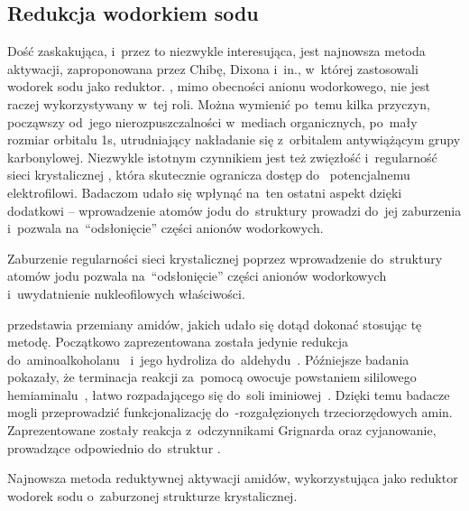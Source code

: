 \subsection{Redukcja wodorkiem sodu}\label{literature:new:sodium-hydride}
Dość zaskakująca, i~przez to niezwykle interesująca, jest najnowsza metoda aktywacji,
  zaproponowana przez Chibę, Dixona i~in., w~której zastosowali wodorek sodu jako reduktor.
, mimo obecności anionu wodorkowego, nie jest raczej wykorzystywany w~tej roli.
Można wymienić po~temu kilka przyczyn, począwszy od~jego nierozpuszczalności w~mediach
  organicznych, po~mały rozmiar orbitalu 1s, utrudniający nakładanie się z~orbitalem
  antywiążącym grupy karbonylowej.
Niezwykle istotnym czynnikiem jest też zwięzłość i~regularność sieci krystalicznej ,
  która skutecznie ogranicza dostęp do~ potencjalnemu elektrofilowi.
Badaczom udało się wpłynąć na~ten ostatni aspekt dzięki dodatkowi  \--- wprowadzenie
  atomów jodu do~struktury prowadzi do~jej zaburzenia i~pozwala na~\enquote{odsłonięcie}
  części anionów wodorkowych.
\begin{marginfigure}[-13\baselineskip]
  
  \caption{
    Zaburzenie regularności sieci krystalicznej  poprzez wprowadzenie do~struktury
      atomów jodu pozwala na~\enquote{odsłonięcie} części anionów wodorkowych
      i~uwydatnienie nukleofilowych właściwości.
  }
  \label{fig:nah-nai-crystal}
\end{marginfigure}

 przedstawia przemiany amidów, jakich udało się dotąd dokonać
  stosując tę metodę.
Początkowo zaprezentowana została jedynie redukcja do~aminoalkoholanu~
  i~jego hydroliza do~aldehydu~.
Późniejsze badania pokazały, że terminacja reakcji za~pomocą  owocuje powstaniem
  sililowego hemiaminalu~, łatwo rozpadającego się do~soli
  iminiowej~.
Dzięki temu badacze mogli przeprowadzić funkcjonalizację do~\textalpha{}-rozgałęzionych
  trzeciorzędowych amin.
Zaprezentowane zostały reakcja z~odczynnikami Grignarda oraz cyjanowanie, prowadzące odpowiednio
  do~struktur .
\begin{scheme*}
  
  \caption{
    Najnowsza metoda reduktywnej aktywacji amidów, wykorzystująca jako reduktor wodorek sodu
      o~zaburzonej strukturze krystalicznej.
  }
  \label{sch:nah-nai-activation}
\end{scheme*}

